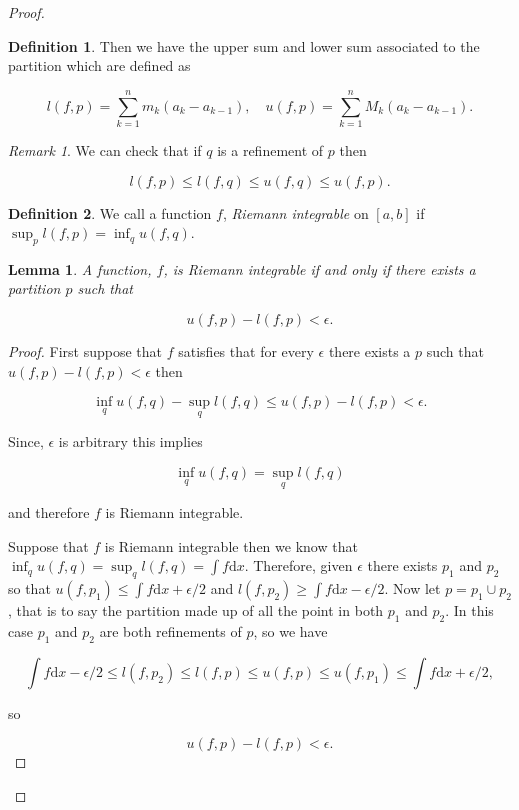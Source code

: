 \documentclass[
]{book}
\newtheorem{lemma}{Lemma}[chapter]
\theoremstyle{definition}
\newtheorem{definition}{Definition}[chapter]
\theoremstyle{definition}
\theoremstyle{definition}
\theoremstyle{definition}
\theoremstyle{remark}
\newtheorem*{remark}{Remark}
\begin{document}
\begin{proof}
\begin{definition}
Then we have the upper sum and lower sum associated to the partition which are defined as

\[ l(f,p) = \sum_{k=1}^n m_k(a_k-a_{k-1}), \quad u(f,p) = \sum_{k=1}^n M_k (a_k-a_{k-1}). \]
\end{definition}

\begin{remark}
We can check that if \(q\) is a refinement of \(p\) then

\[ l(f,p) \leq l(f,q) \leq u(f,q) \leq u(f,p). \]
\end{remark}

\begin{definition}
We call a function \(f\), \emph{Riemann integrable} on \([a,b]\) if \(\sup_p l(f,p) = \inf_q u(f,q)\).
\end{definition}

\begin{lemma}
A function, \(f\), is Riemann integrable if and only if there exists a partition \(p\) such that

\[ u(f,p) - l(f,p) < \epsilon. \]
\end{lemma}

\begin{proof}
First suppose that \(f\) satisfies that for every \(\epsilon\) there exists a \(p\) such that \(u(f,p)-l(f,p) < \epsilon\) then

\[ \inf_q u(f,q) - \sup_q l(f,q) \leq u(f,p)-l(f,p) < \epsilon. \]

Since, \(\epsilon\) is arbitrary this implies

\[ \inf_q u(f,q) = \sup_q l(f,q) \]

and therefore \(f\) is Riemann integrable.

Suppose that \(f\) is Riemann integrable then we know that \(\inf_q u(f,q) = \sup_q l(f,q) = \int f \mathrm{d}x\). Therefore, given \(\epsilon\) there exists \(p_1\) and \(p_2\) so that \(u(f,p_1) \leq \int f \mathrm{d}x + \epsilon/2\) and \(l(f,p_2) \geq \int f \mathrm{d}x - \epsilon/2\). Now let \(p = p_1 \cup p_2\), that is to say the partition made up of all the point in both \(p_1\) and \(p_2\). In this case \(p_1\) and \(p_2\) are both refinements of \(p\), so we have

\[ \int f \mathrm{d}x - \epsilon/2 \leq l(f,p_2) \leq l(f,p) \leq u(f,p) \leq u(f,p_1) \leq \int f \mathrm{d}x + \epsilon/2, \]

so

\[ u(f,p)-l(f,p) < \epsilon. \]
\end{proof}


\end{proof}
\end{document}
